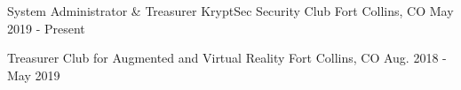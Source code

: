 

\begin{cventries}

  \cventry
    {System Administrator \& Treasurer} %
    {KryptSec Security Club} %
    {Fort Collins, CO} %
    {May 2019 - Present} %
    {}

\vspace{-3mm}
  \cventry
    {Treasurer} %
    {Club for Augmented and Virtual Reality} %
    {Fort Collins, CO} %
    {Aug. 2018 - May 2019} %
    {}

\end{cventries}
